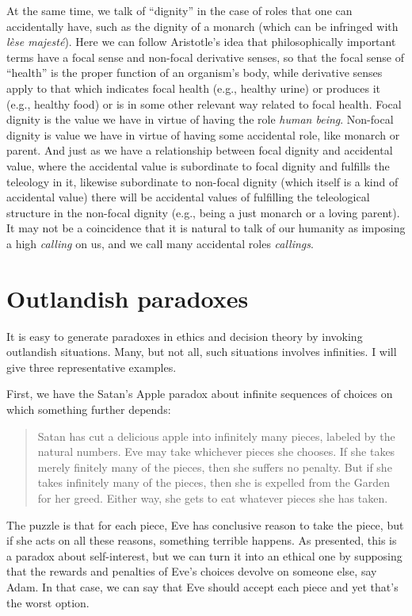 At the same time, we talk of ``dignity'' in the case of roles that one can accidentally have, such as the dignity of a monarch
(which can be infringed with \textit{l\`ese majest\'e}). Here we can follow Aristotle's idea that philosophically important terms have a 
focal sense and non-focal derivative senses, so that the focal sense of ``health'' is the proper function of an organism's body, 
while derivative senses apply to that which indicates focal health (e.g., healthy urine) or produces it (e.g., healthy food) or is in
some other relevant way related to focal health. Focal dignity is the value we have in virtue of having the role \textit{human being}.
Non-focal dignity is value we have in virtue of having some accidental role, like monarch or parent. And just as we have a relationship
between focal dignity and accidental value, where the accidental value is subordinate to focal dignity and fulfills the teleology 
in it, likewise subordinate to non-focal dignity (which itself is a kind of accidental value) there will be accidental values of
fulfilling the teleological structure in the non-focal dignity (e.g., being a just monarch or a loving parent). It may not be a 
coincidence that it is natural to talk of our humanity as imposing a high \textit{calling} on us, and we call many accidental roles
\textit{callings}.

\section{Outlandish paradoxes}\label{sec:outlandish1}
It is easy to generate paradoxes in ethics and decision theory by invoking outlandish situations.
Many, but not all, such situations involves infinities. I will give three representative examples.

First, we have the Satan's Apple paradox about infinite sequences of choices on which something
further depends:
\begin{quote}
Satan has cut a delicious apple into infinitely many pieces, labeled by the natural numbers. Eve
may take whichever pieces she chooses. If she takes merely finitely many of the pieces, then she
suffers no penalty. But if she takes infinitely many of the pieces, then she is expelled from the
Garden for her greed. Either way, she gets to eat whatever pieces she has taken. \parencite{AEH2004}
\end{quote}
The puzzle is that for each piece, Eve has conclusive reason to take the piece, but if she acts on
all these reasons, something terrible happens. As presented, this is a paradox about self-interest, 
but we can turn it into an ethical one by supposing that the rewards and penalties of Eve's choices 
devolve on someone else, say Adam. In that case, we can say that Eve should accept each piece and yet
that's the worst option.

